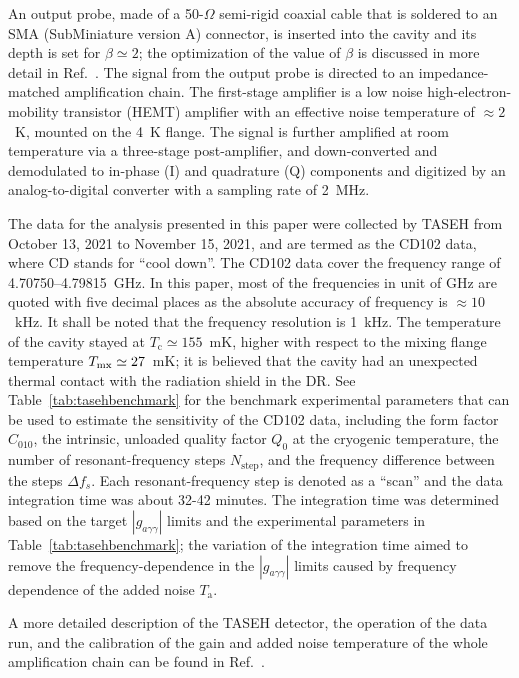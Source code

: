 \documentclass[%
reprint, %
superscriptaddress,
 amsmath,amssymb,
 aps
]{revtex4-2}
\begin{document}
An output probe, made of a 50-$\Omega$ semi-rigid coaxial cable that is 
soldered to an SMA (SubMiniature version A) connector, is inserted into the 
cavity and its depth is set for 
$\beta\simeq2$; the optimization of the value of $\beta$
is discussed in more detail in Ref.~\cite{TASEHInstrumentation}. 
  The signal from the output probe is directed to an 
impedance-matched amplification chain. The first-stage amplifier is  
a low noise high-electron-mobility transistor (HEMT) amplifier with an 
effective noise temperature of $\approx 2$~K, mounted on the 4~K flange. 
The signal is further amplified at room temperature via a 
three-stage post-amplifier, and down-converted 
and demodulated to in-phase (I) and quadrature (Q) components and digitized 
by an analog-to-digital converter with a sampling rate of 2~MHz. 

The data for the analysis presented in this paper were collected by TASEH 
from October 13, 2021 to November 15, 2021, and are termed as the CD102 data, 
where CD stands for ``cool down''. The CD102 data cover the frequency range of 
4.70750--4.79815~GHz. In this paper, most of the frequencies in unit of GHz are
 quoted with five decimal places as the absolute accuracy of frequency is 
$\approx 10$~kHz. It shall be noted that the frequency resolution is 1~kHz.  
The temperature of the cavity stayed at $T_\text{c}\simeq155$~mK, higher 
with respect to the mixing flange temperature $T_{\rm mx}\simeq27$~mK; 
it is believed that the cavity had an unexpected thermal contact with the 
radiation shield in the DR. 
See Table~\ref{tab:tasehbenchmark} for the benchmark experimental parameters 
that can be used to estimate the sensitivity of the CD102 data, including the 
form factor $C_{010}$, the intrinsic, unloaded quality factor $Q_0$ at 
the cryogenic temperature, the number of resonant-frequency steps 
$N_\text{step}$, and the frequency difference between the steps $\Delta f_s$.  
Each resonant-frequency step is denoted as a ``scan'' and the data integration
 time was about 32-42 minutes. The integration time was determined based on 
the target $\left|g_{a\gamma\gamma}\right|$ limits and the experimental 
parameters in Table~\ref{tab:tasehbenchmark}; the variation of the integration 
time aimed to remove the frequency-dependence in the 
$\left|g_{a\gamma\gamma}\right|$ limits caused by frequency dependence of the 
added noise $T_\text{a}$. 

A more detailed description of the TASEH detector, the operation of the 
data run, and the calibration of the gain and added noise temperature of the 
whole amplification chain can be found in Ref.~\cite{TASEHInstrumentation}. 
\end{document}
